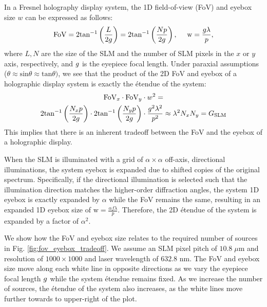 In a Fresnel holography display system, the 1D field-of-view (FoV) and eyebox size $w$ can be expressed as follows:
\begin{equation}    
        \text{FoV} = 2\text{tan}^{-1} \left(\frac{L}{2 g} \right) = 2\text{tan}^{-1} \left(\frac{Np}{2 g} \right), \quad \,\,
        \text{w} = \frac{g \lambda}{p},
\end{equation}
where $L, N$ are the size of the SLM and the number of SLM pixels in the $x$ or $y$ axis, respectively, and $g$ is the eyepiece focal length. Under paraxial assumptions ($\theta \approx \text{sin}\theta \approx \text{tan}\theta)$, we see that the product of the 2D FoV and eyebox of a holographic display system is exactly the \'etendue of the system:
\begin{equation}
\begin{gathered}
    \text{FoV}_x \cdot \text{FoV}_y \cdot w^2 = \\
    2\text{tan}^{-1} \left(\frac{N_xp}{2 g} \right) \cdot 2\text{tan}^{-1} \left(\frac{N_yp}{2 g} \right) \cdot \frac{g^2\lambda^2}{p^2} \approx \lambda^2 N_x N_y = G_\text{SLM}
\end{gathered}
\end{equation}
This implies that there is an inherent tradeoff between the FoV and the eyebox of a holographic display.

When the SLM is illuminated with a grid of $\alpha \times \alpha$ off-axis, directional illuminations, the system eyebox is expanded due to shifted copies of the original spectrum. Specifically, if the directional illumination is selected such that the illumination direction matches the higher-order diffraction angles, the system 1D eyebox is exactly expanded by $\alpha$ while the FoV remains the same, resulting in an expanded 1D eyebox size of $\text{w} = \frac{\alpha f\lambda}{p}$. Therefore, the 2D \'etendue of the system is expanded by a factor of $\alpha^2$. 

We show how the FoV and eyebox size relates to the required number of sources in Fig. \ref{fig:fov_eyebox_tradeoff}. We assume an SLM pixel pitch of $10.8 \; \mu$m and resolution of $1000 \times 1000$ and laser wavelength of $632.8$ nm. The FoV and eyebox size move along each white line in opposite directions as we vary the eyepiece focal length $g$ while the system \'etendue remains fixed. As we increase the number of sources, the \'etendue of the system also increases, as the white lines move further towards to upper-right of the plot.

